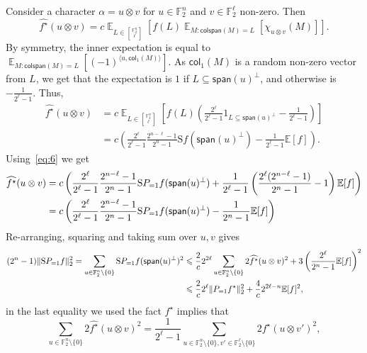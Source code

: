 \documentclass[11pt]{article}
\newcommand\E{\mathbb{E}}
\newcommand\norm[1]{\| #1 \|}
\newcommand\Expect[2]{{\mathop{\mathbb{E}}_{#1}\left[ {#2} \right]}}
\newcommand\inner[2]{\langle{#1},{#2}\rangle}
\renewcommand\leq{\leqslant}
\providecommand{\sqbinom}[2]{\genfrac{[}{]}{0pt}{}{#1}{#2}}
\begin{document}
   Consider a character $\alpha = u\otimes v$ for $u\in\mathbb{F}_2^n$
   and $v\in\mathbb{F}_2^{\ell}$ non-zero. Then
   \[
   \widehat{f^{\star}}(u\otimes v)
   =
   c
   \Expect{L\in {\sqbinom{\mathbb{F}_2^n}{\ell}}}{f(L)\Expect{M:\mathsf{colspan}(M)=L}{\chi_{u\otimes v}(M)}}.
   \]
   By symmetry, the inner expectation is equal to
   $\Expect{M:\mathsf{colspan}(M)=L}{(-1)^{\inner{u}{\mathsf{col}_1(M)}}}$. As $\mathsf{col}_1(M)$ is a random non-zero vector from $L$, we get that the expectation is $1$ if $L\subseteq \mathsf{span}(u)^{\perp}$, and otherwise is $-\frac{1}{2^{\ell}-1}$. Thus,
   \begin{align*}
   \widehat{f^{\star}}(u\otimes v)
   &= c
   \Expect{L\in {\sqbinom{\mathbb{F}_2^n}{\ell}}}{f(L)
   \left(\frac{2^{\ell}}{2^{\ell}-1}1_{L\subseteq \mathsf{span}(u)^{\perp}}-\frac{1}{2^{\ell}-1}\right)}\\
   &=c\left(
   \frac{2^{\ell}}{2^{\ell}-1}
   \frac{2^{n-\ell}-1}{2^{n}-1}\mathrm{S}f(\mathsf{span}(u)^\perp)-\frac{1}{2^{\ell}-1}\E[f]\right).
   \end{align*}
  Using~\eqref{eq:6} we get
  \begin{align}\label{eq:9}
   \widehat{f^{\star}}(u\otimes v)
   &=
   c\left(
   \frac{2^{\ell}}{2^{\ell}-1}
   \frac{2^{n-\ell}-1}{2^{n}-1}\mathrm{S}P_{=1}f(\mathsf{span}(u)^\perp)+
   \frac{1}{2^{\ell}-1}
   \left(
   \frac{2^{\ell}(2^{n-\ell}-1)}{2^{n}-1}-1\right)\E[f]\right)\notag\\
   &=c\left(
   \frac{2^{\ell}}{2^{\ell}-1}
   \frac{2^{n-\ell}-1}{2^{n}-1}\mathrm{S}P_{=1}f(\mathsf{span}(u)^\perp)-
   \frac{1}{2^{n}-1}\E[f]\right)
  \end{align}
  Re-arranging, squaring and taking sum over $u,v$ gives
  \begin{align}\label{eq:7}
  (2^n-1)\norm{\mathrm{S} P_{=1} f}_2^2=\sum\limits_{u\in\mathbb{F}_2^n\setminus\{0\}}
  \mathrm{S}P_{=1}f(\mathsf{span}(u)^\perp)^2
  &\leq 
  \frac{2}{c}2^{2\ell}\sum\limits_{u\in \mathbb{F}_2^n\setminus\{0\}}2\widehat{f^{\star}}(u\otimes v)^2
  +3\left(\frac{2^{\ell}}{2^{n}-1}\E[f]\right)^2\notag\\
  &\leq \frac{2}{c}2^{\ell}\norm{P_{=1} f^{\star}}_2^2
  +\frac{4}{c}2^{2\ell-n}\E[f]^2,
  \end{align}
  in the last equality we used the fact $f^{\star}$ implies that \[
  \sum\limits_{u\in\mathbb{F}_2^n\setminus\{0\}}2\widehat{f^{\star}}(u\otimes v)^2=\frac{1}{2^{\ell}-1}\sum\limits_{u\in\mathbb{F}_2^n\setminus\{0\},v'\in\mathbb{F}_2^{\ell}\setminus\{0\}}2\widehat{f^{\star}}(u\otimes v')^2,
  \]
\end{document}
